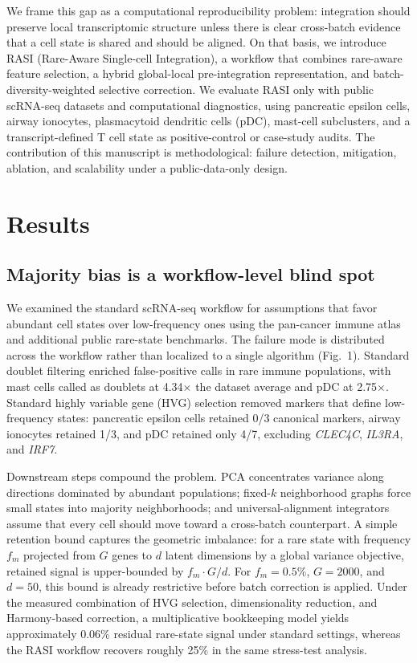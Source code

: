 \documentclass[10pt]{article}
\begin{document}
We frame this gap as a computational reproducibility problem: integration should preserve local transcriptomic structure unless there is clear cross-batch evidence that a cell state is shared and should be aligned. On that basis, we introduce RASI (Rare-Aware Single-cell Integration), a workflow that combines rare-aware feature selection, a hybrid global-local pre-integration representation, and batch-diversity-weighted selective correction. We evaluate RASI only with public scRNA-seq datasets and computational diagnostics, using pancreatic epsilon cells, airway ionocytes, plasmacytoid dendritic cells (pDC), mast-cell subclusters, and a transcript-defined T cell state as positive-control or case-study audits. The contribution of this manuscript is methodological: failure detection, mitigation, ablation, and scalability under a public-data-only design.

\section*{Results}

\subsection*{Majority bias is a workflow-level blind spot}

We examined the standard scRNA-seq workflow for assumptions that favor abundant cell states over low-frequency ones using the pan-cancer immune atlas and additional public rare-state benchmarks.\cite{kang2024,segerstolpe2016,montoro2018} The failure mode is distributed across the workflow rather than localized to a single algorithm (Fig.~1). Standard doublet filtering enriched false-positive calls in rare immune populations, with mast cells called as doublets at 4.34$\times$ the dataset average and pDC at 2.75$\times$.\cite{wolock2019} Standard highly variable gene (HVG) selection removed markers that define low-frequency states: pancreatic epsilon cells retained 0/3 canonical markers, airway ionocytes retained 1/3, and pDC retained only 4/7, excluding \textit{CLEC4C}, \textit{IL3RA}, and \textit{IRF7}.

Downstream steps compound the problem. PCA concentrates variance along directions dominated by abundant populations; fixed-$k$ neighborhood graphs force small states into majority neighborhoods; and universal-alignment integrators assume that every cell should move toward a cross-batch counterpart. A simple retention bound captures the geometric imbalance: for a rare state with frequency $f_m$ projected from $G$ genes to $d$ latent dimensions by a global variance objective, retained signal is upper-bounded by $f_m \cdot G/d$. For $f_m = 0.5\%$, $G = 2000$, and $d = 50$, this bound is already restrictive before batch correction is applied. Under the measured combination of HVG selection, dimensionality reduction, and Harmony-based correction, a multiplicative bookkeeping model yields approximately 0.06\% residual rare-state signal under standard settings, whereas the RASI workflow recovers roughly 25\% in the same stress-test analysis.
\end{document}

